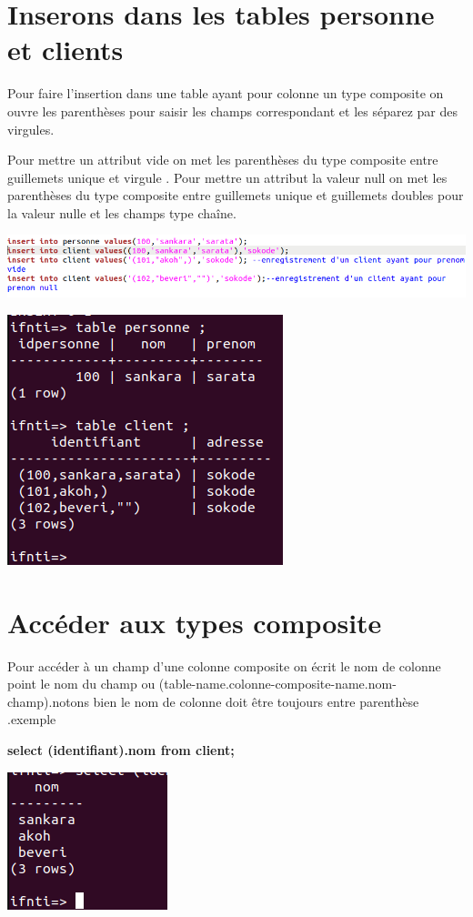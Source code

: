 \documentclass[12pt,b5paper]{article}
\begin{document}
\section{Inserons dans les tables personne et clients}

Pour faire l'insertion dans une table ayant pour colonne un type composite on ouvre les parenthèses pour saisir les champs correspondant et les séparez par des virgules.

Pour mettre un attribut vide on met les parenthèses du type composite entre guillemets unique et virgule .
Pour mettre un attribut la valeur null on met les parenthèses du type composite entre guillemets unique et guillemets doubles  pour la valeur nulle et les champs type chaîne.

\includegraphics[scale=0.5]{in}\\
\newpage
\begin{center}
\includegraphics[scale=0.5]{t}\\
\end{center}
\section{Accéder aux types composite }
Pour accéder à un champ d'une colonne composite on écrit le nom de colonne point le nom  du champ ou (table-name.colonne-composite-name.nom-champ).notons bien le nom de colonne doit être toujours entre parenthèse .exemple

\textbf{select (identifiant).nom from client;}
\begin{center}
\includegraphics[scale=0.5]{nom}\\
\end{center}
\end{document}
